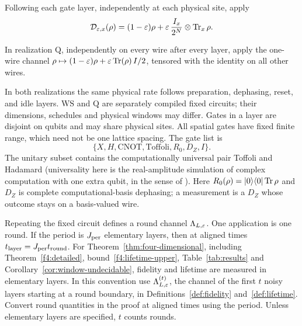 \begin{definition}\label{def:noise-w}
Following each gate layer, independently at each physical site, apply
\begin{equation}\label{eq:site-noise}
 \mathcal D_{\varepsilon,x}(\rho)
 =(1-\varepsilon)\rho+\varepsilon\,\frac{I_x}{2^N}\otimes\operatorname{Tr}_x\rho.
\end{equation}
\end{definition}
\begin{definition}\label{def:noise-q}
In realization \(\mathrm Q\), independently on every wire after every layer, apply
the one-wire channel \(\rho\mapsto(1-\varepsilon)\rho+\varepsilon\operatorname{Tr}(\rho)\,I/2\), tensored with the identity on all other wires.
\end{definition}
In both realizations the same
physical rate follows preparation, dephasing, reset, and idle layers.
\(\mathrm{WS}\) and \(\mathrm Q\) are separately compiled fixed circuits; their dimensions,
schedules and physical windows may differ. Gates in a layer are disjoint
on qubits and may share physical sites. All spatial gates have fixed
finite range, which need not be one lattice spacing. The gate list is
\[
 \{X,H,\mathrm{CNOT},\mathrm{Toffoli},R_0,D_Z,I\}.
\]
The unitary subset contains the computationally universal pair Toffoli and Hadamard \cite{Aharonov2003,Shi2003} (universality here is the real-amplitude simulation of complex computation with one extra qubit, in the sense of \cite[Definition~3 and Theorem~2]{Aharonov2003}). Here \(R_0(\rho)=|0\rangle\langle0|\operatorname{Tr}\rho\) and \(D_Z\) is complete
computational-basis dephasing; a measurement is a \(D_Z\) whose outcome
stays on a basis-valued wire.
\begin{definition}\label{def:round}
Repeating the fixed circuit defines a round channel \(\Lambda_{L,\varepsilon}\).
One application is one round. If the period is \(J_{\rm per}\) elementary layers,
then at aligned times \mbox{\(t_{\rm layer}=J_{\rm per}t_{\rm round}\)}.
For Theorem~\ref{thm:four-dimensional}, including Theorem~\ref{f4:detailed},
bound~\eqref{f4:lifetime-upper}, Table~\ref{tab:results} and
Corollary~\ref{cor:window-undecidable}, fidelity and lifetime are measured
in elementary layers. In this convention use \(\Lambda^{(t)}_{L,\varepsilon}\),
the channel of the first \(t\) noisy layers starting at a round boundary,
in Definitions~\ref{def:fidelity} and~\ref{def:lifetime}. Convert round
quantities in the proof at aligned times using the period.
Unless elementary layers are specified, \(t\) counts rounds.
\end{definition}


